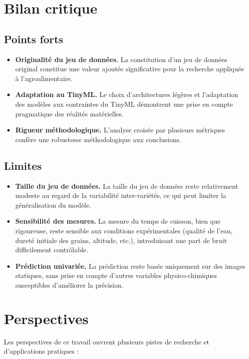 \section{Bilan critique}
\label{sec:bilan_critique}

\subsection{Points forts}
\begin{itemize}
    \item \textbf{Originalité du jeu de données.} La constitution d'un jeu de données original constitue une valeur ajoutée significative pour la recherche appliquée à l'agroalimentaire.
    \item \textbf{Adaptation au TinyML.} Le choix d'architectures légères et l'adaptation des modèles aux contraintes du TinyML démontrent une prise en compte pragmatique des réalités matérielles.
    \item \textbf{Rigueur méthodologique.} L'analyse croisée par plusieurs métriques confère une robustesse méthodologique aux conclusions.
\end{itemize}

\subsection{Limites}
\begin{itemize}
    \item \textbf{Taille du jeu de données.} La taille du jeu de données reste relativement modeste au regard de la variabilité inter-variétés, ce qui peut limiter la généralisation du modèle.
    \item \textbf{Sensibilité des mesures.} La mesure du temps de cuisson, bien que rigoureuse, reste sensible aux conditions expérimentales (qualité de l'eau, dureté initiale des grains, altitude, etc.), introduisant une part de bruit difficilement contrôlable.
    \item \textbf{Prédiction univariée.} La prédiction reste basée uniquement sur des images statiques, sans prise en compte d'autres variables physico-chimiques susceptibles d'améliorer la précision.
\end{itemize}

\section{Perspectives}
\label{sec:perspectives}

Les perspectives de ce travail ouvrent plusieurs pistes de recherche et d'applications pratiques :

